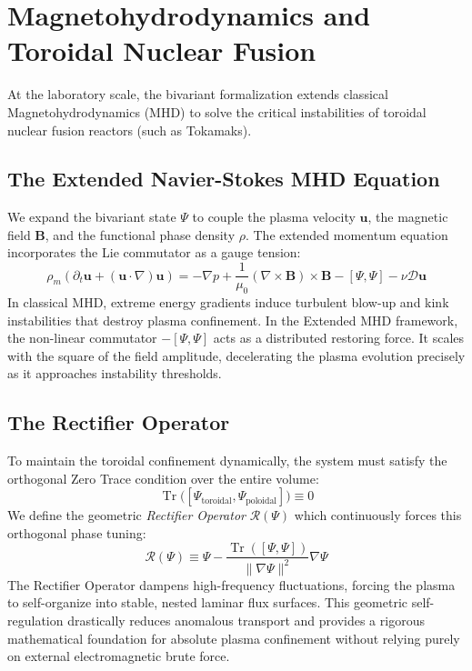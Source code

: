 \section{Magnetohydrodynamics and Toroidal Nuclear Fusion}
\label{part-3:sec:mhd-fusion}

At the laboratory scale, the bivariant formalization extends classical Magnetohydrodynamics (MHD) to solve the critical instabilities of toroidal nuclear fusion reactors (such as Tokamaks).

\subsection{The Extended Navier-Stokes MHD Equation}

We expand the bivariant state $\Psi$ to couple the plasma velocity $\mathbf{u}$, the magnetic field $\mathbf{B}$, and the functional phase density $\rho$. The extended momentum equation incorporates the Lie commutator as a gauge tension:
\begin{equation}\label{eq:mhd-extended}
\rho_m \left( \partial_t \mathbf{u} + (\mathbf{u} \cdot \nabla)\mathbf{u} \right) = -\nabla p + \frac{1}{\mu_0}(\nabla \times \mathbf{B})\times \mathbf{B} - [\Psi, \Psi] - \nu \mathcal{D}\mathbf{u}
\end{equation}
In classical MHD, extreme energy gradients induce turbulent blow-up and kink instabilities that destroy plasma confinement. In the Extended MHD framework, the non-linear commutator $-[\Psi, \Psi]$ acts as a distributed restoring force. It scales with the square of the field amplitude, decelerating the plasma evolution precisely as it approaches instability thresholds.

\subsection{The Rectifier Operator}

To maintain the toroidal confinement dynamically, the system must satisfy the orthogonal Zero Trace condition over the entire volume:
\begin{equation}
\operatorname{Tr}\Big( [\Psi_{\text{toroidal}}, \Psi_{\text{poloidal}}] \Big) \equiv 0
\end{equation}
We define the geometric \emph{Rectifier Operator} $\mathcal{R}(\Psi)$ which continuously forces this orthogonal phase tuning:
\begin{equation}
\mathcal{R}(\Psi) \equiv \Psi - \frac{\operatorname{Tr}([\Psi, \Psi])}{\lVert \nabla \Psi \rVert^2} \nabla \Psi
\end{equation}
The Rectifier Operator dampens high-frequency fluctuations, forcing the plasma to self-organize into stable, nested laminar flux surfaces. This geometric self-regulation drastically reduces anomalous transport and provides a rigorous mathematical foundation for absolute plasma confinement without relying purely on external electromagnetic brute force.
